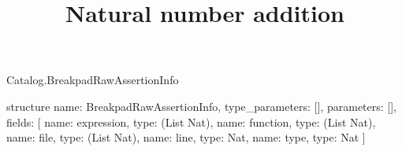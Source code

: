 \begin{lexlean}{Catalog.BreakpadRawAssertionInfo}
\title{Natural number addition}
\begin{semanticmodule}
structure{
  name: BreakpadRawAssertionInfo,
  type_parameters: [],
  parameters: [],
  fields: [
    {name: expression, type: (List Nat)},
    {name: function, type: (List Nat)},
    {name: file, type: (List Nat)},
    {name: line, type: Nat},
    {name: type, type: Nat}
  ]
}
\end{semanticmodule}
\end{lexlean}
